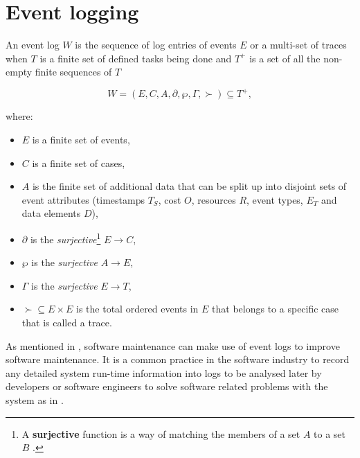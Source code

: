 \section{Event logging}\label{sec:EventLogging}

An event log $W$ is the sequence of log entries of events $E$ or a multi-set of traces when $T$ is a finite set of defined tasks being done and $T^+$ is a set of all the non-empty finite sequences of $T$ \cite{Kherbouche2017}

\begin{equation}
	\label{eq:LogEvent}
	W = (E, C, A, \partial, \wp, \Gamma, \succ) \subseteq T^+,
\end{equation}

where:

\begin{itemize}
	\item $E$ is a finite set of events,
	\item $C$ is a finite set of cases,
	\item $A$ is the finite set of additional data that can be split up into disjoint sets of event attributes (timestamps $T_S$, cost $O$, resources $R$, event types, $E_T$ and data elements $D$),
	\item $\partial$ is the \textit{surjective}\footnote{\label{ftn:Surjective}A \textbf{surjective} function is a way of matching the members of a set $A$ to a set $B$ \cite{Szendrei1990}.} $E\rightarrow C$,
	\item $\wp$ is the \textit{surjective} $A\rightarrow E$,
	\item $\Gamma$ is the \textit{surjective} $E\rightarrow T$,
	\item $\succ \subseteq E\times E$ is the total ordered events in $E$ that belongs to a specific case that is called a trace.
\end{itemize}

As mentioned in , software maintenance can make use of event logs to improve software maintenance. It is a common practice in the software industry to record any detailed system run-time information into logs to be analysed later by developers or software engineers to solve software related problems with the system as in  \cite{Zhu2019}.

